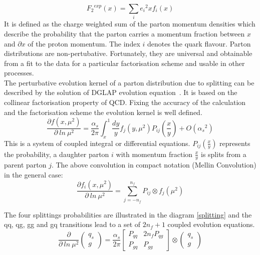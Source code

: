 \begin{equation}
{{F}_2}^{exp} (x)= \sum_i {e_i}^2 x f_i(x)
\end{equation}
\pagebreak
It is defined as the charge weighted sum of the parton momentum densities which describe the probability that the parton carries a momentum
fraction between $ x $ and $ \partial x $ of the proton momentum. The index $i$ denotes the quark flavour. Parton distributions are non-pertubative. Fortunately, they are universal and obtainable from a fit to the data for a particular factorisation scheme and usable in other processes.\\
The perturbative evolution kernel of a parton distribution due to splitting can be described by the solution of DGLAP evolution equation~\cite{Ward:1995xy}. It is based on the collinear factorisation property of QCD. Fixing the accuracy of the calculation and the factorisation scheme the evolution kernel is well defined.  
\begin{equation}
\frac{\partial f(x, \mu^2) }{\partial \: ln \:\mu^2}=
\frac{\alpha_s}{2\pi}\int_{x}^{1}\frac{dy}{y} f_j(y, \mu^2) P_{ij}(\frac{x}{y})+O({\alpha_s}^2)
\end{equation}
This is a system of coupled integral or differential equations. $ P_{ij}(\frac{x}{y}) $ represents the probability, a daughter parton $ i $ with momentum fraction $ \frac{x}{y} $ is splits from a parent parton $ j $.
The above convolution in compact notation (Mellin Convolution) in the general case:
\begin{equation}
\frac{\partial f_i(x, \mu^2) }{\partial \: ln \:\mu^2}=
\sum_{j=-n_f}^{n_f} P_{ij} \otimes f_j(\mu^2)
\end{equation}

The four splittings probabilities are illustrated in the diagram \ref{splitting} and the qq, qg, gg and gq transitions lead to a set of $ 2n_f +1 $ coupled evolution equations.
\begin{equation}
\frac{\partial }{\partial \: ln \:\mu^2} \left(\begin{array}{c}q_s\\ g\end{array}\right)=
\frac{\alpha_s}{2\pi}\begin{bmatrix}P_{qq} & 2n_fP_{qg} \\P_{gq} & P_{gg} \end{bmatrix}\otimes\left(\begin{array}{c}q_s\\ g\end{array}\right)
\end{equation}

